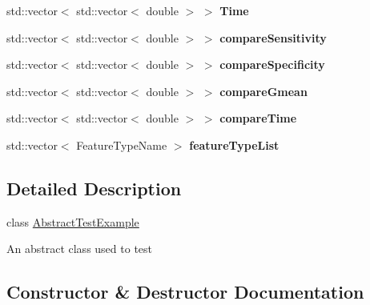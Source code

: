 \begin{DoxyCompactItemize}
\item 
std\+::vector$<$ std\+::vector$<$ double $>$ $>$ {\bfseries Time}\hypertarget{class_abstract_test_example_a7fe4f64d9c951b8bba7c4c2a72951fef}{}\label{class_abstract_test_example_a7fe4f64d9c951b8bba7c4c2a72951fef}

\item 
std\+::vector$<$ std\+::vector$<$ double $>$ $>$ {\bfseries compare\+Sensitivity}\hypertarget{class_abstract_test_example_a7f95e86b6a216bd4bb4ed44715da614a}{}\label{class_abstract_test_example_a7f95e86b6a216bd4bb4ed44715da614a}

\item 
std\+::vector$<$ std\+::vector$<$ double $>$ $>$ {\bfseries compare\+Specificity}\hypertarget{class_abstract_test_example_a41da74c14a10f4e26663541a92566f0f}{}\label{class_abstract_test_example_a41da74c14a10f4e26663541a92566f0f}

\item 
std\+::vector$<$ std\+::vector$<$ double $>$ $>$ {\bfseries compare\+Gmean}\hypertarget{class_abstract_test_example_a8a1aed80ee184cd5f9316f398fed946e}{}\label{class_abstract_test_example_a8a1aed80ee184cd5f9316f398fed946e}

\item 
std\+::vector$<$ std\+::vector$<$ double $>$ $>$ {\bfseries compare\+Time}\hypertarget{class_abstract_test_example_adbdcb4c8a6fc7c2618ba3a98e92d5350}{}\label{class_abstract_test_example_adbdcb4c8a6fc7c2618ba3a98e92d5350}

\item 
std\+::vector$<$ Feature\+Type\+Name $>$ {\bfseries feature\+Type\+List}\hypertarget{class_abstract_test_example_ab5d4d25d4f386acb6f185772ff3e952a}{}\label{class_abstract_test_example_ab5d4d25d4f386acb6f185772ff3e952a}

\end{DoxyCompactItemize}


\subsection{Detailed Description}
class \hyperlink{class_abstract_test_example}{Abstract\+Test\+Example} 

An abstract class used to test 

\subsection{Constructor \& Destructor Documentation}
